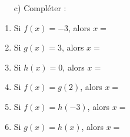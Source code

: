 {    \begin{enumerate}
       \item[c)] Compléter :
\end{enumerate}
	\begin{multicols}{2}
		\begin{enumerate}[label=\roman*)]
		\item Si $f(x)=-3$, alors $x=$
		\item Si $g(x)=3$, alors $x=$
		\item Si $h(x)=0$, alors $x=$
		\item Si $f(x)=g(2)$, alors $x=$
		\item Si $f(x)=h(-3)$, alors $x=$
		\item Si $g(x)=h(x)$, alors $x=$
\end{enumerate}
\end{multicols}

}


